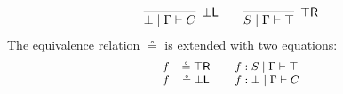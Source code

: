\documentclass[submission,copyright,creativecommons]{eptcs}
\theoremstyle{definition}
\newcommand{\tl}{\otimes \mathsf{L}}
\newcommand{\pass}{\mathsf{pass}}
\newcommand{\unitl}{\mathsf{IL}}
\newcommand{\andlone}{\land \mathsf{L}_{1}}
\newcommand{\andltwo}{\land \mathsf{L}_{2}}
\newcommand{\ax}{\mathsf{ax}}
\newcommand{\ot}{\otimes}
\newcommand{\topr}{\top \mathsf{R}}
\newcommand{\botl}{\bot \mathsf{L}}
\newcommand{\proofbox}[1]{\begin{tabular}{l} #1 \end{tabular}}
\newcommand\cheng[1]{\mbox{}
{\marginpar{\color{blue}CSW}}
{\sf\noindent\color{blue}#1}}%
\begin{document}
\begin{displaymath}
  \begin{array}{c}
    \infer[\botl]{\bot \mid \Gamma \vdash C}{}
    \qquad
    \infer[\topr]{S \mid \Gamma \vdash \top}{}
  \end{array}
\end{displaymath}
The equivalence relation $\circeq$ is extended with two equations:
\begin{equation*}\label{eq:units}
  \small
  \begin{array}{rclll}
    f & \circeq \topr && f : S \mid \Gamma \vdash \top \\
    f & \circeq \botl && f : \bot \mid \Gamma \vdash C
  \end{array}
\end{equation*}
\end{document}
